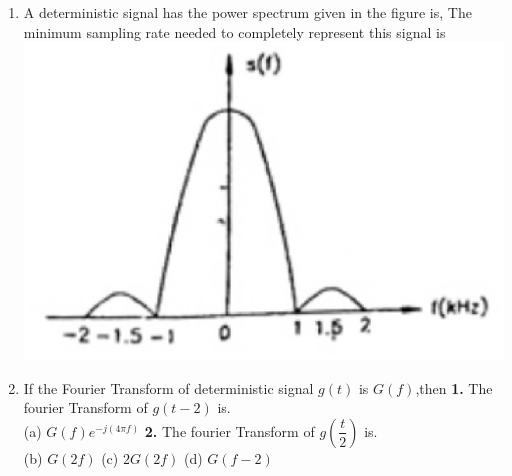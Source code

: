 \documentclass[journal,12pt,twocolumn]{IEEEtran}
\begin{document}
\begin{enumerate}
\begin{enumerate}[(A)]
\end{enumerate}

\item A deterministic signal has the power spectrum given in the figure is, The minimum sampling rate needed to completely represent this signal is\\
\includegraphics[scale=0.4]{fig22.eps}
\begin{enumerate}[(A)]
\end{enumerate}

\item If the Fourier Transform of deterministic signal $g(t)$ is $G(f)$,then \newline \textbf{1.} The fourier Transform of $g(t-2)$ is.\\
        (a) $G(f)e^{-j(4\pi f)}$
       \newline \textbf{2.} The fourier Transform of $g(\dfrac{t}{2})$ is.\\
  			  (b) $G(2f)$
              (c) $2G(2f)$
              (d) $G(f-2)$


\end{enumerate}
\end{document}
